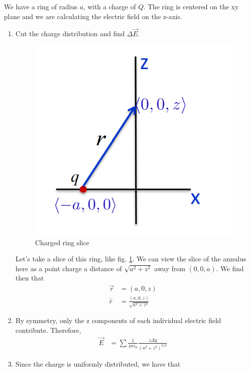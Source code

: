 \documentclass[nobib]{tufte-handout}
\begin{document}
We have a ring of radius $a$, with a charge of $Q$. The ring is centered on the xy plane
and we are calculating the electric field on the z-axis. 
\begin{enumerate}
    \item Cut the charge distribution and find $\Delta \vec{E}$. 
    \begin{figure}
        \center
        \caption{Charged ring slice}
        \label{fig:ringslice}
        \includegraphics[width=\textwidth/2]{images/ringslice.png}
    \end{figure}
    Let's take a slice of this ring, like fig. \ref{fig:ringslice}. We can 
    view the slice of the annulus here as a point charge a distance 
    of $\sqrt{a^2+z^2}$ away from $(0,0,a)$. We find then that 
    \begin{align*}
        \vec{r} &= (a,0,z) \\
        \hat{r} &= \frac{(a,0,z)}{\sqrt{a^2+z^2}}
    \end{align*}
    \item By symmetry, only the z components of each individual electric field
    contribute. Therefore, 
    \begin{align*}
        \vec{E} &= \sum \frac{1}{4 \pi \epsilon_0} \frac{z \Delta q}{(a^2+z^2)^{3/2}}
    \end{align*}
    \item Since the charge is uniformly distributed, we have that 

\end{enumerate}
\end{document}
